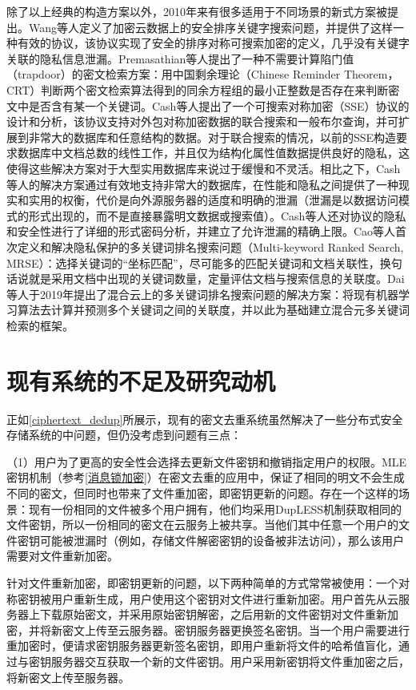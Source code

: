 \documentclass[promaster]{thesis-uestc}
\begin{document}
除了以上经典的构造方案以外，2010年来有很多适用于不同场景的新式方案被提出。Wang等人定义了加密云数据上的安全排序关键字搜索问题，并提供了这样一种有效的协议，该协议实现了安全的排序对称可搜索加密的定义，几乎没有关键字关联的隐私信息泄漏。Premasathian等人提出了一种不需要计算陷门值（trapdoor）的密文检索方案：用中国剩余理论（Chinese Reminder Theorem，CRT）判断两个密文检索算法得到的同余方程组的最小正整数是否存在来判断密文中是否含有某一个关键词。Cash等人提出了一个可搜索对称加密（SSE）协议的设计和分析，该协议支持对外包对称加密数据的联合搜索和一般布尔查询，并可扩展到非常大的数据库和任意结构的数据。对于联合搜索的情况，以前的SSE构造要求数据库中文档总数的线性工作，并且仅为结构化属性值数据提供良好的隐私，这使得这些解决方案对于大型实用数据库来说过于缓慢和不灵活。相比之下，Cash等人的解决方案通过有效地支持非常大的数据库，在性能和隐私之间提供了一种现实和实用的权衡，代价是向外源服务器的适度和明确的泄漏（泄漏是以数据访问模式的形式出现的，而不是直接暴露明文数据或搜索值）。Cash等人还对协议的隐私和安全性进行了详细的形式密码分析，并建立了允许泄漏的精确上限。Cao等人首次定义和解决隐私保护的多关键词排名搜索问题（Multi-keyword Ranked Search, MRSE）：选择关键词的“坐标匹配”，尽可能多的匹配关键词和文档关联性，换句话说就是采用文档中出现的关键词数量，定量评估文档与搜索信息的关联度。Dai等人于2019年提出了混合云上的多关键词排名搜索问题的解决方案：将现有机器学习算法去计算并预测多个关键词之间的关联度，并以此为基础建立混合元多关键词检索的框架。

\section{现有系统的不足及研究动机}\label{现有系统的不足和研究动机}
正如\ref{ciphertext_dedup}所展示，现有的密文去重系统虽然解决了一些分布式安全存储系统的中问题，但仍没考虑到问题有三点：

（1）用户为了更高的安全性会选择去更新文件密钥和撤销指定用户的权限。MLE密钥机制（参考\ref{消息锁加密}）在密文去重的应用中，保证了相同的明文不会生成不同的密文，但同时也带来了文件重加密，即密钥更新的问题。存在一个这样的场景：现有一份相同的文件被多个用户拥有，他们均采用DupLESS机制获取相同的文件密钥，所以一份相同的密文在云服务上被共享。当他们其中任意一个用户的文件密钥可能被泄漏时（例如，存储文件解密密钥的设备被非法访问），那么该用户需要对文件重新加密。

针对文件重新加密，即密钥更新的问题，以下两种简单的方式常常被使用：一个对称密钥被用户重新生成，用户使用这个密钥对文件进行重新加密。用户首先从云服务器上下载原始密文，并采用原始密钥解密，之后用新的文件密钥对文件重新加密，并将新密文上传至云服务器。密钥服务器更换签名密钥。当一个用户需要进行重加密时，便请求密钥服务器更新签名密钥，即用户重新将文件的哈希值盲化，通过与密钥服务器交互获取一个新的文件密钥。用户采用新密钥将文件重加密之后，将新密文上传至服务器。
\end{document}
